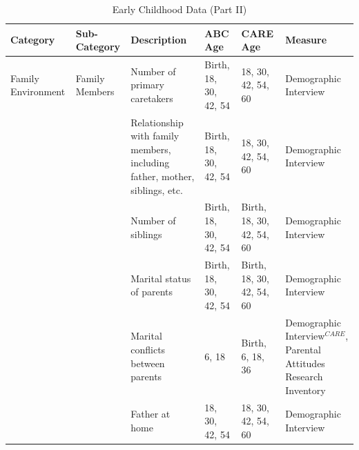 \documentclass[static]{JJH-Beamer}
\begin{document}
\begin{frame}

\begin{table}[H]
\caption{Early Childhood Data (Part II)}\label{tab:ecvars_2}
\begin{center}
\begin{tiny}
\begin{tabular}{L{1.3cm} C{1.8cm} C{2cm} C{1.3cm} C{1.3cm}  C{2cm}}
\toprule
\textbf{Category}	&	\textbf{Sub-Category}	&	\textbf{Description}	&	\textbf{ABC Age}  	&  \textbf{CARE Age}  & 	\textbf{Measure}	\\ \midrule
Family Environment	&	Family Members	&	Number of primary caretakers	&	Birth, 18, 30, 42, 54	&	18, 30, 42, 54, 60	&	Demographic Interview	\\
	&		&	Relationship with family members, including father, mother, siblings, etc.	&	Birth, 18, 30, 42, 54	&	18, 30, 42, 54, 60	&	Demographic Interview	\\
	&		&	Number of siblings	&	Birth, 18, 30, 42, 54	&	Birth, 18, 30, 42, 54, 60	&	Demographic Interview	\\
	&		&	Marital status of parents	&	Birth, 18, 30, 42, 54	&	Birth, 18, 30, 42, 54, 60	&	Demographic Interview	\\
	&		&	Marital conflicts between parents	&	6, 18	&	Birth, 6, 18, 36	&	Demographic Interview$^{CARE}$, Parental Attitudes Research Inventory	\\
	&		& Father at home & 18, 30, 42, 54  & 18, 30, 42, 54, 60 & Demographic Interview \\
\bottomrule
\end{tabular}
\end{tiny}
\end{center}
\end{table}

\end{frame}
\end{document}
